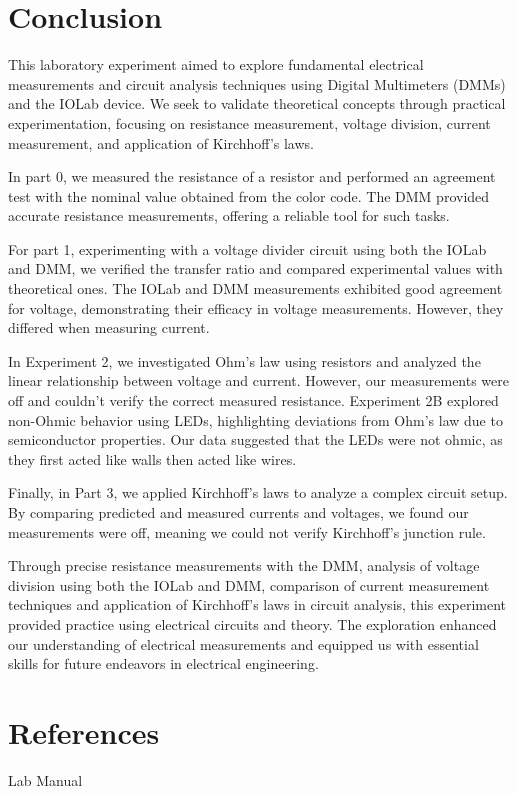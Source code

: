 \documentclass[11pt]{article}
\let\oldsection\section
\renewcommand\section{\clearpage\oldsection}
\begin{document}
    \section{Conclusion}\label{sec:conclusion}

    This laboratory experiment aimed to explore fundamental electrical measurements and circuit analysis techniques using Digital Multimeters (DMMs) and the IOLab device. We seek to validate theoretical concepts through practical experimentation, focusing on resistance measurement, voltage division, current measurement, and application of Kirchhoff's laws.

    In part 0, we measured the resistance of a resistor and performed an agreement test with the nominal value obtained from the color code. The DMM provided accurate resistance measurements, offering a reliable tool for such tasks.

    For part 1, experimenting with a voltage divider circuit using both the IOLab and DMM, we verified the transfer ratio and compared experimental values with theoretical ones. The IOLab and DMM measurements exhibited good agreement for voltage, demonstrating their efficacy in voltage measurements. However, they differed when measuring current.

    In Experiment 2, we investigated Ohm's law using resistors and analyzed the linear relationship between voltage and current. However, our measurements were off and couldn't verify the correct measured resistance. Experiment 2B explored non-Ohmic behavior using LEDs, highlighting deviations from Ohm's law due to semiconductor properties. Our data suggested that the LEDs were not ohmic, as they first acted like walls then acted like wires.

    Finally, in Part 3, we applied Kirchhoff's laws to analyze a complex circuit setup. By comparing predicted and measured currents and voltages, we found our measurements were off, meaning we could not verify Kirchhoff's junction rule.

    Through precise resistance measurements with the DMM, analysis of voltage division using both the IOLab and DMM, comparison of current measurement techniques and application of Kirchhoff's laws in circuit analysis, this experiment provided practice using electrical circuits and theory. The exploration enhanced our understanding of electrical measurements and equipped us with essential skills for future endeavors in electrical engineering.

    \section{References}\label{sec:references}

    Lab Manual
\end{document}
